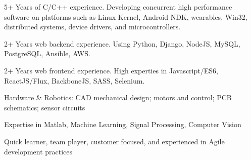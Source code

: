
\begin{cventries}

\begin{cvitems} %
    \item {5+ Years of C/C++ experience. Developing concurrent high performance software on platforms such as Linux Kernel, Android NDK, wearables, Win32, distributed systems, device drivers, and microcontrollers.}
    \item {2+ Years web backend experience. Using Python, Django, NodeJS, MySQL, PostgreSQL, Ansible, AWS.}
    \item {2+ Years web frontend experience. High experties in Javascript/ES6, ReactJS/Flux, BackboneJS, SASS, Selenium.}
    \item {Hardware \& Robotics: CAD mechanical design; motors and control; PCB schematics; sensor circuits}
    \item {Expertise in Matlab, Machine Learning, Signal Processing, Computer Vision}
    \item {Quick learner, team player, customer focused, and experienced in Agile development practices}
\end{cvitems}

\end{cventries}